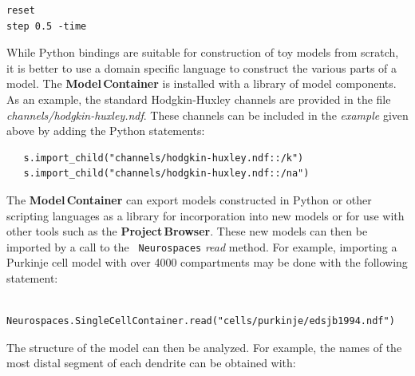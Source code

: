 \documentclass[12pt]{article}
\begin{document}
{\begin{minipage}{1\linewidth}
\begin{minipage}[t]{.50\linewidth}
\begin{verbatim}
reset
step 0.5 -time
\end{verbatim}
    \end{minipage}
  \end{minipage}
  \linenumbers
  \vspace*{1mm}
}

While Python bindings are suitable for construction of toy models from
scratch, it is better to use a domain specific language to construct
the various parts of a model. The {\bf Model\,Container} is
installed with a library of model components.  As an example, the
standard Hodgkin-Huxley channels are provided in the file {\it
  channels/hodgkin-huxley.ndf}.  These channels can be included in the
{\it example} given above by adding the Python statements:

{\footnotesize
\begin{verbatim}
   s.import_child("channels/hodgkin-huxley.ndf::/k")
   s.import_child("channels/hodgkin-huxley.ndf::/na")
\end{verbatim}
}

The {\bf Model\,Container} can export models constructed in Python or other
scripting languages as a library for incorporation into new models or
for use with other tools such as the {\bf Project\,Browser}.
These new models can then be imported by a call to the {\tt
  Neurospaces} {\it read} method. For example, importing a Purkinje
cell model with over 4000 compartments may be done with the following
statement:

{\footnotesize
\begin{verbatim}
   Neurospaces.SingleCellContainer.read("cells/purkinje/edsjb1994.ndf")
\end{verbatim}
}

The structure of the model can then be analyzed.  For example, the
names of the most distal segment of each dendrite can be obtained
with:
\end{document}
